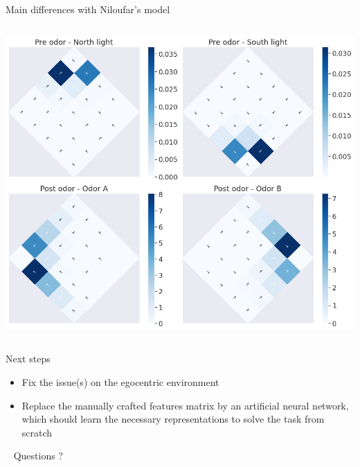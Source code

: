 \documentclass[bigger]{beamer}
\begin{document}
\begin{frame}[label={sec:org1eefb35}]{Main differences with Niloufar's model}
\begin{columns}
\begin{column}{0.3\columnwidth}
\begin{center}
\includegraphics[width=\textwidth]{img/q-learning_allo_best_actions_maps.png}
\end{center}
\end{column}
\end{columns}
\end{frame}
\begin{frame}[<+->][label={sec:org7d8d44e}]{Next steps}
\begin{itemize}
\item Fix the issue(s) on the egocentric environment
\item Replace the manually crafted features matrix by an artificial neural network, which should learn the necessary representations to solve the task from scratch
\end{itemize}
\end{frame}
\begin{frame}[label={sec:org46965e5},standout]{~}
Questions ?
\end{frame}
\end{document}
